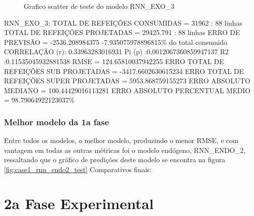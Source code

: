 \documentclass[	12pt, Times, openright, twoside, a4paper, english, brazil]{abntex2}
\begin{document}
                \begin{figure}[!ht]
                  \caption{Grafico scatter de teste do modelo RNN\_EXO\_3 \label{fig:case1_rnn_exo_3_test_scatter} }
                \end{figure}
                RNN\_EXO\_3:
                TOTAL DE REFEIÇÕES CONSUMIDAS = 31962 : 88 linhas\newline
                TOTAL DE REFEIÇÕES PROJETADAS = 29425.791 : 88 linhas\newline
                ERRO DE PREVISÃO = -2536.208984375 -7.935075978896815\% do total consumido\newline
                CORRELAÇÃO (r): 0.33963283016931 Pi (p) :0.0012067360859947137 R2 :0.11535045932881538\newline
                RMSE = 124.65810037942255\newline
                ERRO TOTAL DE REFEIÇÕES SUB PROJETADAS = -3417.6602630615234\newline
                ERRO TOTAL DE REFEIÇÕES SUPER PROJETADAS = 5953.868759155273\newline
                ERRO ABSOLUTO MEDIANO = 100.44429016113281\newline
                ERRO ABSOLUTO PERCENTUAL MEDIO = 98.79064922123037\%\newline

    	    \subsubsection{Melhor modelo da 1a fase}
                Entre todos os modelos, o melhor modelo, produzindo o menor RMSE, e com vantagem em todas as outras métricas foi o modelo endógeno, RNN\_ENDO\_2, ressaltando que o gráfico de predições deste modelo se encontra na figura \ref{fig:case1_rnn_endo2_test}
                Comparativos finais:

    \section{2a Fase Experimental}
\end{document}
